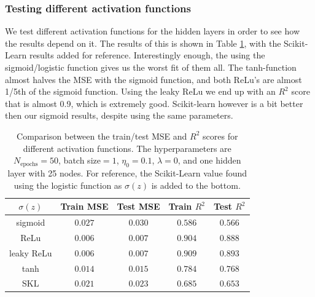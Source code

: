 \documentclass[a4paper]{article}
\newcommand{\Nepochs}{N_{\text{epochs}}}
\begin{document}
\subsubsection*{Testing different activation functions}
We test different activation functions for the hidden layers in order to see how the results depend on it. The results of this is shown in Table \ref{tab:franke_actfunc}, with the Scikit-Learn results added for reference. Interestingly enough, the using the sigmoid/logistic function gives us the worst fit of them all. The tanh-function almost halves the MSE with the sigmoid function, and both ReLu's are almost 1/5th of the sigmoid function. Using the leaky ReLu we end up with an $R^2$ score that is almost 0.9, which is extremely good. Scikit-learn however is a bit better then our sigmoid results, despite using the same parameters.
\begin{table}[H]
  \centering
  \caption{Comparison between the train/test MSE and $R^2$ scores for different activation functions. The hyperparameters are $\Nepochs=50$, batch size$=1$, $\eta_0=0.1$, $\lambda=0$, and one hidden layer with 25 nodes. For reference, the Scikit-Learn value found using the logistic function as $\sigma(z)$ is added to the bottom.}
  \label{tab:franke_actfunc}
  \begin{tabular}{c|c|c|c|c}
    \hline\hline
    $\sigma(z)$ & Train MSE & Test MSE & Train $R^2$ & Test $R^2$\\\hline
	sigmoid & $0.027$ & $0.030$ & $0.586$ & $0.566$\\
	ReLu & $0.006$ & $0.007$ & $0.904$ & $0.888$\\
	leaky ReLu & $0.006$ & $0.007$ & $0.909$ & $0.893$\\
	tanh & $0.014$ & $0.015$ & $0.784$ & $0.768$\\\hline
	SKL & $0.021$ & $0.023$ & $0.685$ & $0.653$\\\hline
    \end{tabular}
\end{table}
\end{document}

